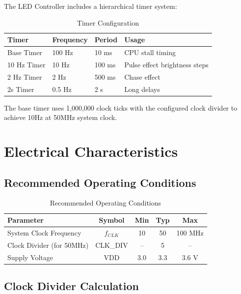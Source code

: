 \documentclass[11pt,a4paper]{article}
\begin{document}
The LED Controller includes a hierarchical timer system:

\begin{table}[H]
\centering
\caption{Timer Configuration}
\begin{tabular}{@{}llll@{}}
\toprule
\textbf{Timer} & \textbf{Frequency} & \textbf{Period} & \textbf{Usage} \\
\midrule
Base Timer & 100 Hz & 10 ms & CPU stall timing \\
10 Hz Timer & 10 Hz & 100 ms & Pulse effect brightness steps \\
2 Hz Timer & 2 Hz & 500 ms & Chase effect \\
2s Timer & 0.5 Hz & 2 s & Long delays \\
\bottomrule
\end{tabular}
\end{table}

The base timer uses 1,000,000 clock ticks with the configured clock divider to achieve 10Hz at 50MHz system clock.

\section{Electrical Characteristics}

\subsection{Recommended Operating Conditions}

\begin{table}[H]
\centering
\caption{Recommended Operating Conditions}
\begin{tabular}{@{}lcccc@{}}
\toprule
\textbf{Parameter} & \textbf{Symbol} & \textbf{Min} & \textbf{Typ} & \textbf{Max} \\
\midrule
System Clock Frequency & $f_{CLK}$ & 10 & 50 & 100 MHz \\
Clock Divider (for 50MHz) & CLK\_DIV & -- & 5 & -- \\
Supply Voltage & VDD & 3.0 & 3.3 & 3.6 V \\
\bottomrule
\end{tabular}
\end{table}

\subsection{Clock Divider Calculation}
\end{document}
